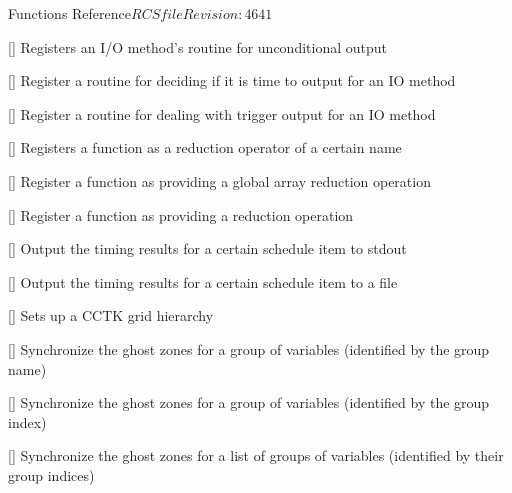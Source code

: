 \begin{cactuspart}{ Functions Reference}{$RCSfile$}{$Revision: 4641 $}
\begin{Lentry}
\item[\code{CCTK\_RegisterIOMethodOutputVarAs}]
  [\pageref{CCTK-RegisterIOMethodOutputVarAs}]
  Registers an I/O method's routine for unconditional output

\item[\code{CCTK\_RegisterIOMethodTimeToOutput}]
  [\pageref{CCTK-RegisterIOMethodTimeToOutput}]
  Register a routine for deciding if it is time to output for an IO method

\item[\code{CCTK\_RegisterIOMethodTriggerOutput}]
  [\pageref{CCTK-RegisterIOMethodTriggerOutput}]
  Register a routine for dealing with trigger output for an IO method

\item[\code{CCTK\_RegisterLocalArrayReductionOperator}] [\pageref{CCTK-RegisterLocalArrayReductionOperator}]
  Registers a function as a reduction operator of a certain name

\item[\code{CCTK\_RegisterReduceArraysGloballyOperator}]
  [\pageref{CCTK-RegisterReduceArraysGloballyOperator}]
  Register a function as providing a global array reduction operation

\item[\code{CCTK\_RegisterReductionOperator}]
  [\pageref{CCTK-RegisterReductionOperator}]
  Register a function as providing a reduction operation

\item[\code{CCTK\_SchedulePrintTimes}] [\pageref{CCTK-SchedulePrintTimes}]
  Output the timing results for a certain schedule item to stdout

\item[\code{CCTK\_SchedulePrintTimesToFile}] [\pageref{CCTK-SchedulePrintTimesToFile}]
  Output the timing results for a certain schedule item to a file

\item[\code{CCTK\_SetupGH}] [\pageref{CCTK-SetupGH}]
  Sets up a CCTK grid hierarchy

\item[\code{CCTK\_SyncGroup}] [\pageref{CCTK-SyncGroup}]
  Synchronize the ghost zones for a group of variables (identified by the group name)

\item[\code{CCTK\_SyncGroupI}] [\pageref{CCTK-SyncGroupI}]
  Synchronize the ghost zones for a group of variables (identified by the group index)

\item[\code{CCTK\_SyncGroupsI}] [\pageref{CCTK-SyncGroupsI}]
  Synchronize the ghost zones for a list of groups of variables (identified by their group indices)


\end{Lentry}
\end{cactuspart}
